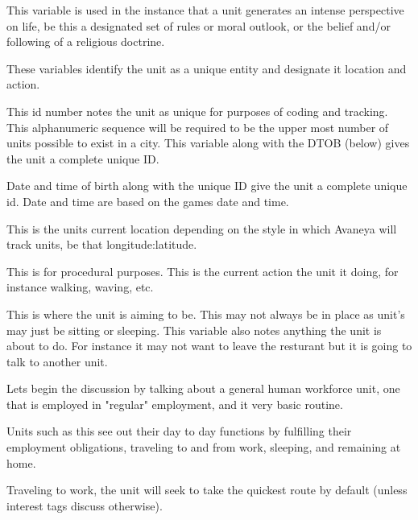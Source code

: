 \StartSubsection {}


This variable is used in the instance that a unit generates an intense perspective on life, be this a designated set of rules or moral outlook, or the belief and/or following of a religious doctrine.



These variables identify the unit as a unique entity and designate it location and action.

This id number notes the unit as unique for purposes of coding and tracking. This alphanumeric sequence will be required to be the upper most number of units possible to exist in a city. This variable along with the DTOB (below) gives the unit a complete unique ID.

Date and time of birth along with the unique ID give the unit a complete unique id. Date and time are based on the games date and time.

This is the units current location depending on the style in which Avaneya will track units, be that longitude:latitude.

This is for procedural purposes. This is the current action the unit it doing, for instance walking, waving, etc.

This is where the unit is aiming to be. This may not always be in place as unit's may just be sitting or sleeping. This variable also notes anything the unit is about to do. For instance it may not want to leave the resturant but it is going to talk to another unit. 











Lets begin the discussion by talking about a general human workforce unit, one that is employed in "regular" employment, and it very basic routine.

Units such as this see out their day to day functions by fulfilling their employment obligations, traveling to and from work, sleeping, and remaining at home.

Traveling to work, the unit will seek to take the quickest route by default (unless interest tags discuss otherwise).

